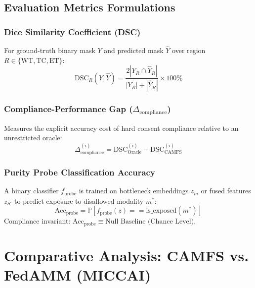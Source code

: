 \documentclass[11pt,a4paper]{article}
\begin{document}
\subsection{Evaluation Metrics Formulations}

\subsubsection{Dice Similarity Coefficient (DSC)}
For ground-truth binary mask $Y$ and predicted mask $\hat{Y}$ over region $R \in \{\text{WT}, \text{TC}, \text{ET}\}$:
\begin{equation}
\text{DSC}_R(Y, \hat{Y}) = \frac{2 |Y_R \cap \hat{Y}_R|}{|Y_R| + |\hat{Y}_R|} \times 100\%
\end{equation}

\subsubsection{Compliance-Performance Gap ($\Delta_{\text{compliance}}$)}
Measures the explicit accuracy cost of hard consent compliance relative to an unrestricted oracle:
\begin{equation}
\Delta_{\text{compliance}}^{(i)} = \text{DSC}_{\text{Oracle}}^{(i)} - \text{DSC}_{\text{CAMFS}}^{(i)}
\end{equation}

\subsubsection{Purity Probe Classification Accuracy}
A binary classifier $f_{\text{probe}}$ is trained on bottleneck embeddings $z_m$ or fused features $z_{S'}$ to predict exposure to disallowed modality $m^*$:
\begin{equation}
\text{Acc}_{\text{probe}} = \mathbb{P}\left[ f_{\text{probe}}(z) == \text{is\_exposed}(m^*) \right]
\end{equation}
Compliance invariant: $\text{Acc}_{\text{probe}} \equiv \text{Null Baseline (Chance Level)}$.

\newpage

\section{Comparative Analysis: CAMFS vs. FedAMM (MICCAI)}
\end{document}
